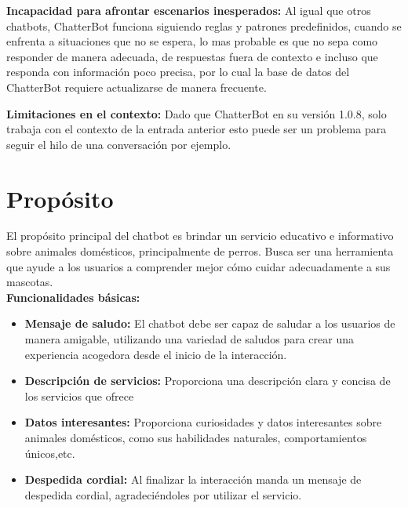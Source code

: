 \documentclass[a4paper,12pt]{article}
\begin{document}
\textbf{Incapacidad para afrontar escenarios inesperados:}  Al igual que otros chatbots, ChatterBot funciona 
siguiendo reglas y patrones predefinidos, cuando se enfrenta a situaciones que no se espera, lo mas probable es que 
no sepa como responder de manera adecuada, de respuestas fuera de contexto e incluso que responda con información 
poco precisa, por lo cual la base de datos del ChatterBot requiere actualizarse de manera frecuente.

\textbf{Limitaciones en el contexto:} Dado que ChatterBot en su versión 1.0.8, solo trabaja con el contexto de 
la entrada anterior esto puede ser un problema para seguir el hilo de una conversación por ejemplo. 




\section{Propósito}

El propósito principal del chatbot es brindar un servicio educativo e informativo sobre animales domésticos, principalmente de perros. Busca ser una herramienta que ayude a los usuarios a comprender mejor cómo cuidar adecuadamente a sus mascotas.\\

\textbf{Funcionalidades básicas:}
\begin{itemize}
    \item \textbf{Mensaje de saludo:} El chatbot debe ser capaz de saludar a los usuarios de manera amigable, utilizando una variedad de saludos para crear una experiencia acogedora desde el inicio de la interacción.
    
    \item \textbf{Descripción de servicios:} Proporciona una descripción clara y concisa de los servicios que ofrece 

    \item \textbf{Datos interesantes:} Proporciona curiosidades y datos interesantes sobre animales domésticos, como sus habilidades naturales, comportamientos únicos,etc.

    \item \textbf{Despedida cordial:} Al finalizar la interacción manda un mensaje de despedida cordial, agradeciéndoles por utilizar el servicio.
\end{itemize}
\end{document}
